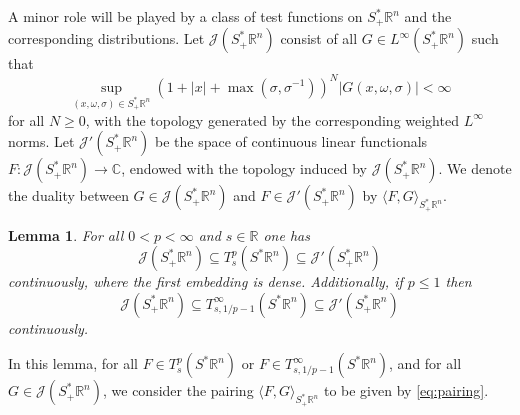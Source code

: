 \documentclass{amsart}
\newcommand {\C}{{\mathbb C}}
\newcommand {\Da}{\mathcal{D}}
\newcommand {\ud}{\mathrm{d}}
\newcommand {\J}{\mathcal{J}}
\newcommand {\rb}{\rangle}
\newcommand {\lb}{\langle}
\newcommand {\loc}{\mathrm{loc}}
\newcommand {\R}{\mathbb R}
\newcommand {\Rn}{\mathbb{R}^{n}}
\newcommand {\Sp}{S^{*}\Rn}
\newcommand {\Spp}{S^{*}_{+}\Rn}
\newcommand {\w}{\omega}
\newcommand {\vanish}[1]{\relax}
\newtheorem{lemma}[theorem]{Lemma}
\theoremstyle{definition}
\numberwithin{equation}{section}
\begin{document}
A minor role will be played by a class of test functions on $\Spp$ and the corresponding  distributions. Let $\J(\Spp)$ consist of all $G\in L^{\infty}(\Spp)$ such that 
\begin{equation}\label{eq:classJ}
\sup_{(x,\w,\sigma)\in\Spp}(1+|x|+\max(\sigma,\sigma^{-1}))^{N} |G(x,\w,\sigma)|<\infty
\end{equation}
for all $N\geq0$, with the topology generated by the corresponding weighted $L^{\infty}$ norms. %
Let $\J'(\Spp)$ be the space of  continuous linear functionals $F:\J(\Spp)\to \C$, endowed with the topology induced by $\J(\Spp)$. We denote the duality between $G\in\J(\Spp)$ and $F\in \J'(\Spp)$ by $\lb F,G\rb_{\Spp}$. \vanish{If $G\in L^{1}_{\loc}(\Spp)$ is such that 
\[
F\mapsto \int_{\Spp}F(x,\w,\sigma)\overline{G(x,\w,\sigma)}\ud x\ud\w\frac{\ud\sigma}{\sigma}
\]
defines an element of $\Da'(\Spp)$, then we write $G\in\Da'(\Spp)$. Note in particular that 
\[
L^{1}\big(\Spp,(1+|x|+\Upsilon(\sigma)^{-1})^{-N}\ud x\ud\w\frac{\ud\sigma}{\sigma}\big)\subseteq\Da'(\Spp)
\]
for all $N\geq0$.}



\begin{lemma}\label{lem:distributions}
For all $0<p<\infty$ and $s\in\R$ one has
\begin{equation}\label{eq:distributions1}
\J(\Spp)\subseteq T^{p}_{s}(\Sp)\subseteq \J'(\Spp)
\end{equation}
continuously, where the first embedding is dense. Additionally, if $p\leq1$ then
\begin{equation}\label{eq:distributions2}
\J(\Spp)\subseteq T^{\infty}_{s,1/p -1}(\Sp)\subseteq \J'(\Spp)
\end{equation}
continuously.
\end{lemma}
In this lemma, for all $F\in T^{p}_{s}(\Sp)$ or $F\in T^{\infty}_{s,1/p -1}(\Sp)$, and for all $G\in \J(\Spp)$, we consider the pairing $\lb F,G\rb_{\Spp}$ to be given by \eqref{eq:pairing}. 
\end{document}
